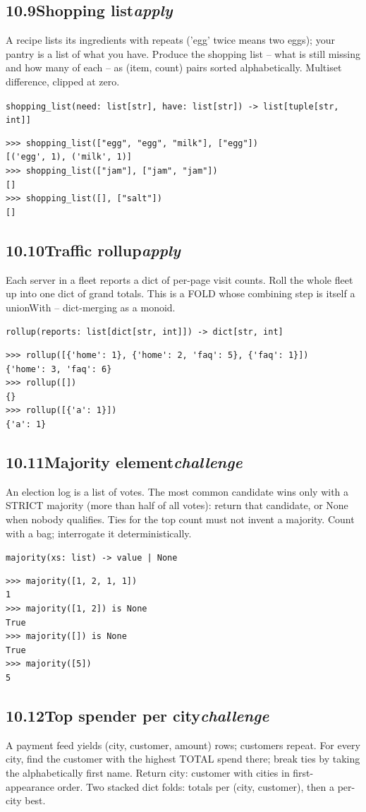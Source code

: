\documentclass[10pt,letterpaper]{book}
\begin{document}
\subsection*{10.9\quad Shopping list\hfill\textnormal{\textit{apply}}}
A recipe lists its ingredients with repeats ('egg' twice means two eggs); your pantry is a list of what you have. Produce the shopping list -- what is still missing and how many of each -- as (item, count) pairs sorted alphabetically. Multiset difference, clipped at zero.

\noindent\texttt{shopping\_list(need: list[str], have: list[str]) -> list[tuple[str, int]]}
\begin{lstlisting}[style=ex]
>>> shopping_list(["egg", "egg", "milk"], ["egg"])
[('egg', 1), ('milk', 1)]
>>> shopping_list(["jam"], ["jam", "jam"])
[]
>>> shopping_list([], ["salt"])
[]
\end{lstlisting}
\subsection*{10.10\quad Traffic rollup\hfill\textnormal{\textit{apply}}}
Each server in a fleet reports a dict of per-page visit counts. Roll the whole fleet up into one dict of grand totals. This is a FOLD whose combining step is itself a unionWith -- dict-merging as a monoid.

\noindent\texttt{rollup(reports: list[dict[str, int]]) -> dict[str, int]}
\begin{lstlisting}[style=ex]
>>> rollup([{'home': 1}, {'home': 2, 'faq': 5}, {'faq': 1}])
{'home': 3, 'faq': 6}
>>> rollup([])
{}
>>> rollup([{'a': 1}])
{'a': 1}
\end{lstlisting}
\subsection*{10.11\quad Majority element\hfill\textnormal{\textit{challenge}}}
An election log is a list of votes. The most common candidate wins only with a STRICT majority (more than half of all votes): return that candidate, or None when nobody qualifies. Ties for the top count must not invent a majority. Count with a bag; interrogate it deterministically.

\noindent\texttt{majority(xs: list) -> value | None}
\begin{lstlisting}[style=ex]
>>> majority([1, 2, 1, 1])
1
>>> majority([1, 2]) is None
True
>>> majority([]) is None
True
>>> majority([5])
5
\end{lstlisting}
\subsection*{10.12\quad Top spender per city\hfill\textnormal{\textit{challenge}}}
A payment feed yields (city, customer, amount) rows; customers repeat. For every city, find the customer with the highest TOTAL spend there; break ties by taking the alphabetically first name. Return {city: customer} with cities in first-appearance order. Two stacked dict folds: totals per (city, customer), then a per-city best.
\end{document}
